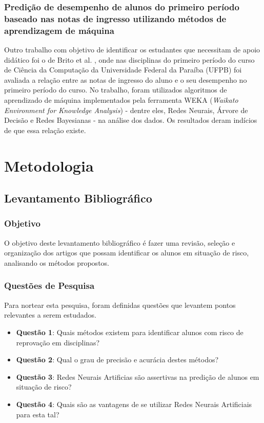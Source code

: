 \documentclass[
	12pt,				%
	openright,			%
	oneside,
	a4paper,			%
	english,			%
	french,				%
	spanish,			%
	brazil,				%
	]{abntex2}
\begin{document}
\subsection{Predição de desempenho de alunos do primeiro período baseado nas notas de ingresso utilizando métodos de aprendizagem de máquina}
\label{sec:Pred2}
Outro trabalho com objetivo de identificar os estudantes que necessitam de apoio didático foi o de Brito et al. \cite{DeBrito2014}, onde nas disciplinas do primeiro período do curso de Ciência da Computação da Universidade Federal da Paraíba (UFPB) foi avaliada a relação entre as notas de ingresso do aluno e o seu desempenho no primeiro período do curso. No trabalho, foram utilizados algoritmos de aprendizado de máquina implementados pela ferramenta WEKA (\textit{Waikato Environment for Knowledge Analysis}) - dentre eles, Redes Neurais, Árvore de Decisão e Redes Bayesianas - na análise dos dados. Os resultados deram indícios de que essa relação existe.


\chapter{Metodologia}

\section{Levantamento Bibliográfico}
\label{sec:L}
\subsection{Objetivo}
\label{sec:Obj}
O objetivo deste levantamento bibliográfico é fazer uma revisão, seleção e organização dos artigos que possam identificar os alunos em situação de risco, analisando os métodos propostos.

\subsection{Questões de Pesquisa}
\label{sec:QP}
Para nortear esta pesquisa, foram definidas questões que levantem pontos relevantes a serem estudados.
\begin{itemize}
    \item \textbf{Questão 1}: Quais métodos existem para identificar alunos com risco de reprovação em disciplinas?
    \item \textbf{Questão 2}: Qual o grau de precisão e acurácia destes métodos?
    \item \textbf{Questão 3}: Redes Neurais Artificias são assertivas na predição de alunos em situação de risco?
    \item \textbf{Questão 4}: Quais são as vantagens de se utilizar Redes Neurais Artificiais para esta tal?
\end{itemize}
\end{document}
